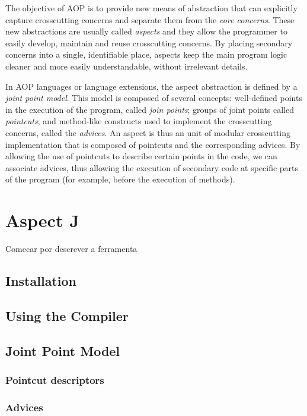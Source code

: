 \documentclass{template}
\begin{document}
The objective of AOP is to provide new means of abstraction that can explicitly capture crosscutting concerns
and separate them from the \emph{core concerns}. These new abstractions are usually called \emph{aspects}
and they allow the programmer to easily develop, maintain and reuse crosscutting concerns. By placing
secondary concerns into a single, identifiable place, aspects keep the main program logic cleaner and more easily
understandable, without irrelevant details.

In AOP languages or language extensions, the aspect abstraction is defined by a \emph{joint point model}.
This model is composed of several concepts: well-defined points in the execution of the program,
called \emph{join points}; groups of joint points called \emph{pointcuts}; and method-like constructs used to
implement the crosscutting concerns, called the \emph{advices}. An aspect is thus an unit of modular
crosscutting implementation that is composed of pointcuts and the corresponding advices. By allowing the
use of pointcuts to describe certain points in the code, we can associate advices, thus allowing the execution
of secondary code at specific parts of the program (for example, before the execution of methods).

\section{Aspect J}

Comecar por descrever a ferramenta

\subsection{Installation}

\subsection{Using the Compiler}

\subsection{Joint Point Model}

\subsubsection{Pointcut descriptors}
\subsubsection{Advices}
\end{document}
